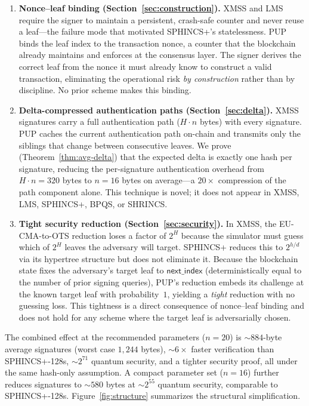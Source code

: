 \documentclass[11pt]{article}
\begin{document}
\begin{enumerate}
\item \textbf{Nonce--leaf binding (Section~\ref{sec:construction}).}
XMSS and LMS require the signer to maintain a persistent, crash-safe
counter and never reuse a leaf---the failure mode that motivated
SPHINCS+'s statelessness. PUP binds the leaf index to the transaction
nonce, a counter that the blockchain already maintains and enforces at
the consensus layer. The signer derives the correct leaf from the nonce
it must already know to construct a valid transaction, eliminating the
operational risk \emph{by construction} rather than by discipline.
No prior scheme makes this binding.

\item \textbf{Delta-compressed authentication paths
(Section~\ref{sec:delta}).}
XMSS signatures carry a full authentication path ($H \cdot n$ bytes)
with every signature. PUP caches the current authentication path
on-chain and transmits only the siblings that change between
consecutive leaves. We prove (Theorem~\ref{thm:avg-delta}) that the
expected delta is exactly one hash per signature, reducing the
per-signature authentication overhead from $H \cdot n = 320$ bytes to
$n = 16$ bytes on average---a $20\times$ compression of the path
component alone. This technique is novel; it does not appear in XMSS,
LMS, SPHINCS+, BPQS, or SHRINCS.

\item \textbf{Tight security reduction (Section~\ref{sec:security}).}
In XMSS, the EU-CMA-to-OTS reduction loses a factor of $2^H$ because
the simulator must guess which of $2^H$ leaves the adversary will
target. SPHINCS+ reduces this to $2^{h/d}$ via its hypertree structure
but does not eliminate it. Because the blockchain state fixes the
adversary's target leaf to $\mathsf{next\_index}$ (deterministically
equal to the number of prior signing queries), PUP's reduction embeds
its challenge at the known target leaf with probability~$1$, yielding a
\emph{tight} reduction with no guessing loss. This tightness is a
direct consequence of nonce--leaf binding and does not hold for any
scheme where the target leaf is adversarially chosen.
\end{enumerate}

The combined effect at the recommended parameters ($n = 20$) is
${\sim}884$-byte average signatures (worst case $1{,}244$ bytes),
${\sim}6\times$ faster verification than SPHINCS+-128s, ${\sim}2^{71}$
quantum security, and a tighter security proof, all under the same
hash-only assumption. A compact parameter set ($n = 16$) further
reduces signatures to ${\sim}580$ bytes at ${\sim}2^{55}$ quantum
security, comparable to SPHINCS+-128s.
Figure~\ref{fig:structure} summarizes the structural simplification.
\end{document}
